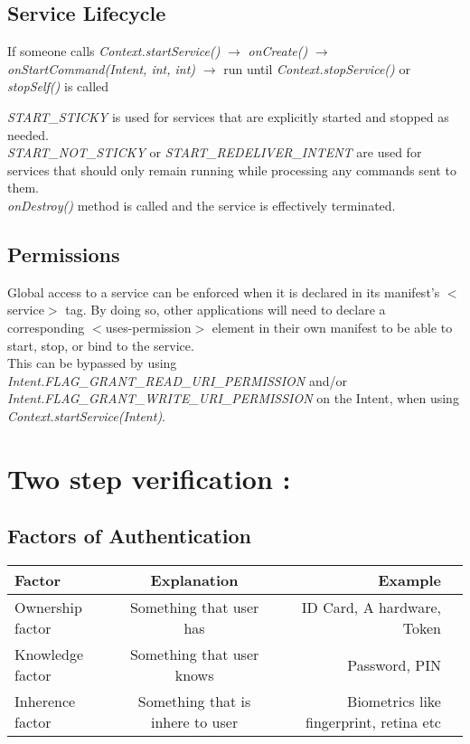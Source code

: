 \documentclass[12pt]{article}
\begin{document}
\subsection{Service Lifecycle}
 If someone calls \textit{Context.startService()} $\longrightarrow$ \textit{onCreate()} $\longrightarrow$ \\ \textit{onStartCommand(Intent, int, int) } $\longrightarrow$  run until \textit{Context.stopService()} or \textit{stopSelf()} is called

\textit{START\_STICKY} is used for services that are explicitly started and stopped as needed. \\
\textit{START\_NOT\_STICKY} or \textit{START\_REDELIVER\_INTENT} are used for services that should only remain running while processing any commands sent to them.\\
\textit{onDestroy()} method is called and the service is effectively terminated.

\subsection{Permissions}
Global access to a service can be enforced when it is declared in its manifest's $<$service$>$ tag. 
By doing so, other applications will need to declare a corresponding $<$uses-permission$>$ element in their own manifest to be able to start, stop, or bind to the service.\\
This can be bypassed by using \textit{Intent.FLAG\_GRANT\_READ\_URI\_PERMISSION} and/or \textit{Intent.FLAG\_GRANT\_WRITE\_URI\_PERMISSION }on the Intent, when using \textit{Context.startService(Intent)}.
\pagebreak
\section{Two step verification : }
\subsection{Factors of Authentication}
\begin{tabular}{| l | c | r | p{}}
	\hline	
		Factor & Explanation & Example\\
		\hline
		\hline
		Ownership factor & Something that user has & ID Card, A hardware, Token \\ \hline
		Knowledge factor & Something that user knows & Password, PIN \\	\hline
		Inherence factor & Something that is inhere to user & Biometrics like fingerprint, retina etc\\
	\hline
\end{tabular}
\end{document}
